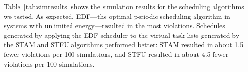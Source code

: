 Table~\ref{tab:simresults} shows the simulation results for the scheduling algorithms we tested.  As expected, EDF---the optimal periodic scheduling algorithm in systems with unlimited energy---resulted in the most violations.  Schedules generated by applying the EDF scheduler to the virtual task lists generated by the \textsc{STAM} and \textsc{STFU} algorithms performed better: \textsc{STAM} resulted in about 1.5 fewer violations per 100 simulations, and \textsc{STFU} resulted in about 4.5 fewer violations per 100 simulations.





























